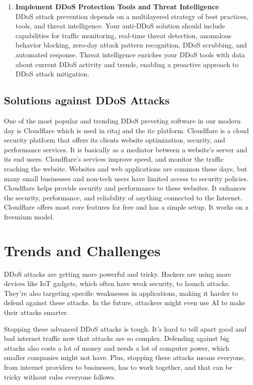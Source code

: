 \documentclass[a4paper, 12pt]{report} %
\begin{document}
\begin{enumerate}
                        \item \textbf{Implement DDoS Protection Tools and Threat Intelligence} \\ DDoS attack prevention depends on a multilayered strategy of best practices, tools, and threat intelligence. Your anti-DDoS solution should include capabilities for traffic monitoring, real-time threat detection, anomalous behavior blocking, zero-day attack pattern recognition, DDoS scrubbing, and automated response. Threat intelligence enriches your DDoS tools with data about current DDoS activity and trends, enabling a proactive approach to DDoS attack mitigation.
                        

                    \end{enumerate}

                    \subsection{Solutions against DDoS Attacks}
                    One of the most popular and trending DDoS preveting software in our modern day is Cloudflare which is used in ritaj and the itc platform. Cloudflare is a cloud security platform that offers its clients website optimization, security, and performance services. It is basically as a mediator between a website’s server and its end users. Cloudflare's services improve speed, and monitor the traffic reaching the website. Websites and web applications are common these days, but many small businesses and non-tech users have limited access to security policies. Cloudflare helps provide security and performance to these websites. It enhances the security, performance, and reliability of anything connected to the Internet. Cloudflare offers most core features for free and has a simple setup. It works on a freemium model.


                    \section{Trends and Challenges}
                    DDoS attacks are getting more powerful and tricky. Hackers are using more devices like IoT gadgets, which often have weak security, to launch attacks. They're also targeting specific weaknesses in applications, making it harder to defend against these attacks. In the future, attackers might even use AI to make their attacks smarter.

                    Stopping these advanced DDoS attacks is tough. It's hard to tell apart good and bad internet traffic now that attacks are so complex. Defending against big attacks also costs a lot of money and needs a lot of computer power, which smaller companies might not have. Plus, stopping these attacks means everyone, from internet providers to businesses, has to work together, and that can be tricky without rules everyone follows.
                    
\end{document}
